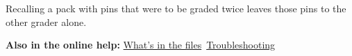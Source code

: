 Recalling a pack with pins that were to be graded twice leaves those pins to the other grader alone.

{\small\textbf{Also in the online help:} \href{https://github.com/agadin/micro-speed-grader/blob/main/docs/help/handoff.md\#whats-in-the-files}{What's in the files}\,\onlinemark{} \textperiodcentered{} \href{https://github.com/agadin/micro-speed-grader/blob/main/docs/help/handoff.md\#troubleshooting}{Troubleshooting}\,\onlinemark{}}
